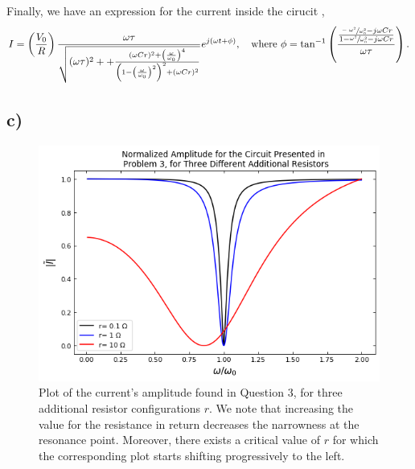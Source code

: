 \documentclass[
	12pt,
	]{article}
\theoremstyle{definition}
\theoremstyle{definition}
\theoremstyle{definition}
\theoremstyle{definition}
\theoremstyle{definition}
\theoremstyle{example}
\theoremstyle{note}
\theoremstyle{remark}
\theoremstyle{example}
\begin{document}
 				Finally, we have an expression for the current inside the cirucit ,
 				\begin{equation*}
 					I = \left(\frac{V_{0}}{R}\right) \frac{\omega\tau}{\sqrt{(\omega\tau)^{2} + + \frac{(\omega C r)^{2} + \left(\frac{\omega}{\omega_{0}}\right)^{4}}{\left(1-\left(\frac{\omega}{\omega_{0}}\right)^{2}\right)^{2} + (\omega C r)^{2}}}}e^{j(\omega t + \phi)}, \ \ \ \text{where  } \phi = \tan^{-1}\left(\frac{\frac{\sfrac{-\omega^{2}}{\omega_{0}^{2}} -j\omega C r}{1 - \sfrac{\omega^{2}}{\omega_{0}^{2}} - j\omega C r}}{\omega\tau}\right).
 				\end{equation*}
 			\subsection*{c) }
 				\begin{figure}[H]
 					\centering
 					\includegraphics[width = 0.8\linewidth]{PHYS241_Ass4_Figure2.png}
 					\caption{Plot of the current's amplitude found in Question 3, for three additional resistor configurations $r$. We note that increasing the value for the resistance in return decreases the narrowness at the resonance point. Moreover, there exists a critical value of $r$ for which the corresponding plot starts shifting progressively to the left.}
 				\end{figure}
 				
	
\end{document}
